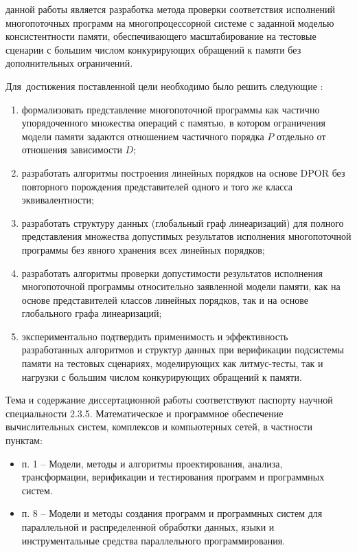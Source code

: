 {\aim} данной работы является разработка метода проверки соответствия
исполнений многопоточных программ на многопроцессорной системе с
заданной моделью консистентности памяти, обеспечивающего
масштабирование на тестовые сценарии с большим числом конкурирующих
обращений к памяти без дополнительных ограничений.

Для~достижения поставленной цели необходимо было решить следующие {\tasks}:
\begin{enumerate}[beginpenalty=10000] %
  \item формализовать представление многопоточной программы как
    частично упорядоченного множества операций с памятью, в котором
    ограничения модели памяти задаются отношением частичного порядка
    $P$ отдельно от отношения зависимости $D$;
  \item разработать алгоритмы построения линейных порядков на основе DPOR без
    повторного порождения представителей одного и того же класса
    эквивалентности;
  \item разработать структуру данных (глобальный граф линеаризаций) для
    полного представления множества допустимых результатов исполнения
    многопоточной программы без явного
    хранения всех линейных порядков;
  \item разработать алгоритмы проверки допустимости результатов
    исполнения многопоточной программы относительно заявленной модели
    памяти, как на основе представителей классов линейных порядков,
    так и на основе глобального графа линеаризаций;
  \item экспериментально подтвердить применимость и эффективность
    разработанных алгоритмов и структур данных при верификации
    подсистемы памяти на тестовых сценариях, моделирующих как
    литмус-тесты, так и нагрузки с большим числом конкурирующих
    обращений к памяти.
\end{enumerate}

Тема и содержание диссертационной работы соответствуют паспорту
научной специальности 2.3.5. Математическое и программное обеспечение
вычислительных систем, комплексов и компьютерных сетей, в
частности пунктам:
\begin{itemize}
  \item п. 1 -- Модели, методы и алгоритмы проектирования, анализа,
    трансформации, верификации и тестирования программ и программных систем.
  \item п. 8 -- Модели и методы создания программ и программных
    систем для параллельной и распределенной обработки данных, языки
    и инструментальные средства параллельного программирования.
\end{itemize}

